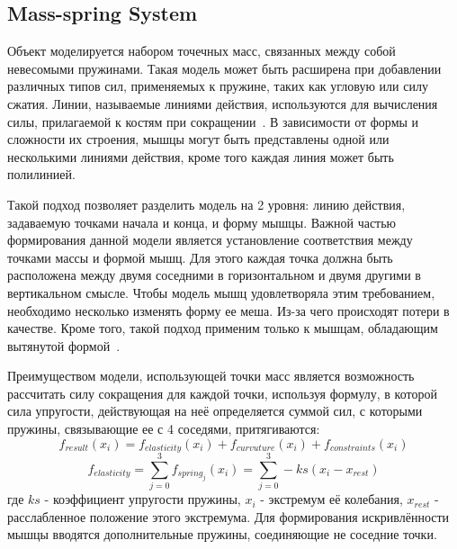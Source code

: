 \subsection{Mass-spring System}
\label{subsec:MSS}
Объект моделируется набором точечных масс, связанных между собой невесомыми пружинами. Такая модель может быть расширена при добавлении различных типов сил, применяемых к пружине, таких как угловую или силу сжатия. Линии, называемые линиями действия, используются для вычисления силы, прилагаемой к костям при сокращении~\cite{nedel}. В зависимости от формы и сложности их строения, мышцы могут быть представлены одной или несколькими линиями действия, кроме того каждая линия может быть полилинией.
\par Такой подход позволяет разделить модель на 2 уровня: линию действия, задаваемую точками начала и конца, и форму мышцы. Важной частью формирования данной модели является установление соответствия между точками массы и формой мышц. Для этого каждая точка должна быть расположена между двумя соседними в горизонтальном и двумя другими в вертикальном смысле. Чтобы модель мышц удовлетворяла этим требованием, необходимо несколько изменять форму ее меша. Из-за чего происходят потери в качестве. Кроме того, такой подход применим только к мышцам, обладающим вытянутой формой~\cite{nedel}.
\par Преимуществом модели, использующей точки масс является возможность рассчитать силу сокращения для каждой точки, используя формулу, в которой сила упругости, действующая на неё определяется суммой сил, с которыми пружины, связывающие ее с 4 соседями, притягиваются:
\begin{equation}\label{mss_01}
f_{result}(x_{i})=f_{elasticity}(x_{i})+f_{curvuture}(x_{i})+f_{constraints}(x_{i})
\end{equation}
\begin{equation}\label{mss_02}
f_{elasticity}=\sum_{j=0}^{3}f_{spring_{j}}(x_{i})=\sum_{j=0}^{3}-ks(x_{i}-x_{rest})
\end{equation}
где $ks$ - коэффициент упругости пружины, $x_{i}$ - экстремум её колебания, $x_{rest}$ - расслабленное положение этого экстремума. Для формирования искривлённости мышцы вводятся дополнительные пружины, соединяющие не соседние точки.

